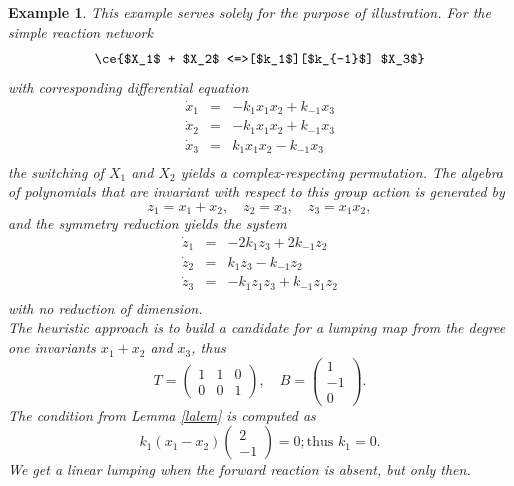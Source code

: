 \documentclass{article}
\newtheorem{example}{Example}
\begin{document}
\begin{example}{\em 
    This example serves solely for the purpose of illustration. For the simple reaction network
    \begin{equation*}
   \ce{$X_1$ + $X_2$ <=>[$k_1$][$k_{-1}$] $X_3$}
\end{equation*}
with corresponding differential equation
\[
\begin{array}{rcl}
    \dot x_1&=&-k_1x_1x_2+k_{-1}x_3\\
    \dot x_2&=&-k_1x_1x_2+k_{-1}x_3\\
    \dot x_3&=&k_1x_1x_2-k_{-1}x_3\\
\end{array}
\]
the switching of $X_1$ and $X_2$ yields a complex-respecting permutation. The algebra of polynomials that are invariant with respect to this group action is generated by 
\[
z_1=x_1+x_2,\quad z_2=x_3,\quad z_3=x_1x_2,
\]
and the symmetry reduction yields the system
\[
\begin{array}{rcl}
    \dot z_1 &=&-2k_1z_3+2k_{-1}z_2  \\
     \dot z_2 &=&k_1z_3-k_{-1}z_2  \\
      \dot z_3 &=&-k_1z_1z_3+k_{-1}z_1z_2  \\
\end{array}
\]
with no reduction of dimension.\\
The heuristic approach is to build a candidate for a lumping map from the degree one invariants $x_1+x_2$ and $x_3$, thus
\[
T=\begin{pmatrix}
    1&1&0\\ 0&0&1
\end{pmatrix}, \quad B=\begin{pmatrix}
    1\\ -1\\ 0
\end{pmatrix}.
\]
The condition from Lemma \ref{lalem} is computed as
\[
k_1(x_1-x_2)\begin{pmatrix}
    2\\-1
\end{pmatrix}=0; \text{thus  } k_{1}=0.
\]
We get a linear lumping when the forward reaction is absent, but only then.}
\end{example}
\end{document}
